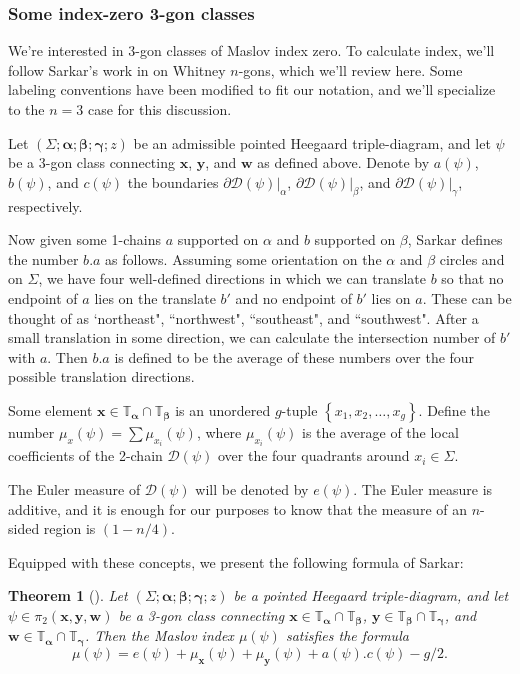 \documentclass[11pt]{article}
\theoremstyle{plain} \newtheorem{thm}{Theorem}[subsection]
\theoremstyle{plain} \newtheorem{cor}[thm]{Corollary}
\theoremstyle{plain} \newtheorem{prop}[thm]{Proposition}
\theoremstyle{plain} \newtheorem{conj}[thm]{Conjecture}
\theoremstyle{plain} \newtheorem{lem}[thm]{Lemma}
\theoremstyle{definition} \newtheorem{df}[thm]{Definition}
\theoremstyle{remark} \newtheorem{rmk}[thm]{Remark}
\theoremstyle{remark} \newtheorem{obs}[thm]{Observation}
\newcommand{\ba}{\boldsymbol{\alpha}}
\newcommand{\bb}{\boldsymbol{\beta}}
\newcommand{\bg}{\boldsymbol{\gamma}}
\newcommand{\Ta}{\mathbb{T}_{\ba}}
\newcommand{\Tb}{\mathbb{T}_{\bb}}
\newcommand{\bx}{\mathbf{x}}
\newcommand{\by}{\mathbf{y}}
\newcommand{\bw}{\mathbf{w}}
\newcommand{\tor}[1]{\mathbb{T}_{#1}}
\begin{document}
\subsubsection{Some index-zero 3-gon classes}\label{sec:ztri}

We're interested in 3-gon classes of Maslov index zero.  To calculate index, we'll follow Sarkar's work in \cite{sarkar:tri} on Whitney $n$-gons, which we'll review here.  Some labeling conventions have been modified to fit our notation, and we'll specialize to the $n=3$ case for this discussion.

Let $\left(\Sigma; \ba; \bb; \bg; z\right)$ be an admissible pointed Heegaard triple-diagram, and let $\psi$ be a 3-gon class connecting $\bx$, $\by$, and $\bw$ as defined above.  Denote by $a(\psi)$, $b(\psi)$, and $c(\psi)$ the boundaries $\partial \mathcal{D}(\psi)|_{\alpha}$, $\partial \mathcal{D}(\psi)|_{\beta}$, and $\partial \mathcal{D}(\psi)|_{\gamma}$, respectively.

Now given some 1-chains $a$ supported on $\alpha$ and $b$ supported on $\beta$, Sarkar defines the number $b.a$ as follows.  Assuming some orientation on the $\alpha$ and $\beta$ circles and on $\Sigma$, we have four well-defined directions in which we can translate $b$ so that no endpoint of $a$ lies on the translate $b'$ and no endpoint of $b'$ lies on $a$.  These can be thought of as `northeast", ``northwest", ``southeast", and ``southwest".  After a small translation in some direction, we can calculate the intersection number of $b'$ with $a$.  Then $b.a$ is defined to be the average of these numbers over the four possible translation directions.

Some element $\bx \in \Ta \cap \Tb$ is an unordered $g$-tuple $ \left\{ x_{1}, x_{2}, \ldots, x_{g} \right \}$.  Define the number $\mu_{x}(\psi) = \sum \mu_{x_{i}}(\psi)$, where $\mu_{x_{i}}(\psi)$ is the average of the local coefficients of the 2-chain $\mathcal{D}(\psi)$ over the four quadrants around $x_{i} \in \Sigma$.

The Euler measure of $\mathcal{D}(\psi)$ will be denoted by $e(\psi)$.  The Euler measure is additive, and it is enough for our purposes to know that the measure of an $n$-sided region is $(1-n/4)$.

Equipped with these concepts, we present the following formula of Sarkar:

\begin{thm}[\cite{sarkar:tri}]\label{maslovformula}
Let $\left(\Sigma; \ba; \bb; \bg; z\right)$ be a pointed Heegaard triple-diagram, and let $\psi \in \pi_2(\bx,\by,\bw)$ be a 3-gon class connecting $\bx \in \tor{\ba}\cap\tor{\bb}$, $\by \in \tor{\bb}\cap\tor{\bg}$, and $\bw \in \tor{\ba} \cap \tor{\bg}$.  Then the Maslov index $\mu (\psi)$ satisfies the formula
\begin{equation*}
\mu (\psi) = e(\psi) + \mu_{\bx}(\psi) + \mu_{\by} (\psi) + a(\psi).c(\psi) - g/2.
\label{eq:sarkar}
\end{equation*}
\end{thm}
\end{document}
